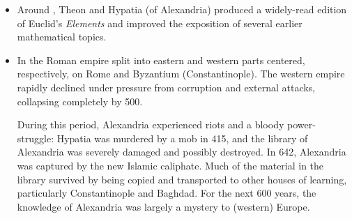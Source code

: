 \begin{itemize}
  \item Around , Theon and Hypatia (of Alexandria) produced a widely-read edition of Euclid's \emph{Elements} and improved the exposition of several earlier mathematical topics.
  
  \item In  the Roman empire split into eastern and western parts centered, respectively, on Rome and Byzantium (Constantinople). The western empire rapidly declined under pressure from corruption and external attacks, collapsing completely by 500.\par
  During this period, Alexandria experienced riots and a bloody power-struggle: Hypatia was murdered by a mob in 415, and the library of Alexandria was severely damaged and possibly destroyed. In 642, Alexandria was captured by the new Islamic caliphate. Much of the material in the library survived by being copied and transported to other houses of learning, particularly Constantinople and Baghdad. For the next 600 years, the knowledge of Alexandria was largely a mystery to (western) Europe.
\end{itemize}

\bigskip
\vfil


